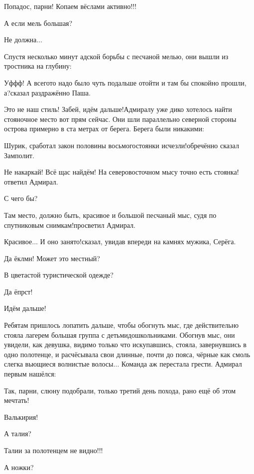 \diagdash Попадос, парни! Копаем вёслами активно!!!

\diagdash А если мель большая?

\diagdash Не должна$\ldots$

Спустя несколько минут адской борьбы с песчаной мелью, они вышли из тростника на глубину:

\diagdash Уф\sdash ф\sdash ф! А всего\sdash то надо было чуть подальше отойти и там бы спокойно прошли, а?\mdash сказал раздражённо Паша.

\diagdash Это не наш стиль! Забей, идём дальше!\mdash Адмиралу уже дико хотелось найти стояночное место вот прям сейчас. Они шли параллельно северной стороны острова примерно в ста метрах от берега. Берега были никакими:

\diagdash Шурик, сработал закон половины восьмого\cite{Квадригин}\mdash стоянки исчезли!\mdash обречённо сказал Замполит.

\diagdash Не накаркай! Всё щас найдём! На северо\sdash восточном мысу точно есть стоянка!\mdash ответил Адмирал.

\diagdash С чего бы?

\diagdash Там место, должно быть, красивое и большой песчаный мыс, судя по спутниковым снимкам!\mdash просветил Адмирал.

\diagdash Красивое$\ldots$ И оно занято!\mdash сказал, увидав впереди на камнях мужика, Серёга.

\diagdash Да ёклмн! Может это местный?

\diagdash В цветастой туристической одежде?

\diagdash Да ёпрст!

\diagdash Идём дальше!

Ребятам пришлось лопатить дальше, чтобы обогнуть мыс, где действительно стояла лагерем большая группа с детьми\sdash дошкольниками. Обогнув мыс, они увидели, как девушка, видимо только что искупавшись, стояла, завернувшись в одно полотенце, и расчёсывала свои длинные, почти до пояса, чёрные как смоль слегка вьющиеся волнистые волосы$\ldots$ Команда аж перестала грести. Адмирал первым нашёлся:

\diagdash Так, парни, слюну подобрали, только третий день похода, рано ещё об этом мечтать!

\diagdash Валькирия!

\diagdash А талия?

\diagdash Талии за полотенцем не видно!!!

\diagdash А ножки?

